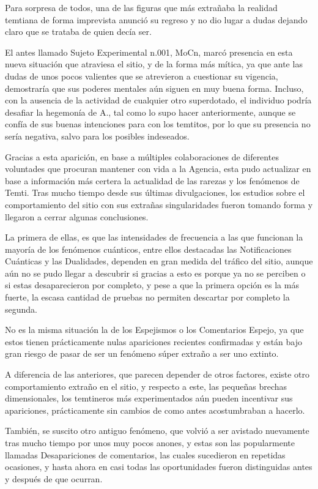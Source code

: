 \documentclass[
]{book}
\begin{document}
Para sorpresa de todos, una de las figuras que más extrañaba la realidad temtiana de forma imprevista anunció su regreso y no dio lugar a dudas dejando claro que se trataba de quien decía ser.

El antes llamado Sujeto Experimental n.001, MoCn, marcó presencia en esta nueva situación que atraviesa el sitio, y de la forma más mítica, ya que ante las dudas de unos pocos valientes que se atrevieron a cuestionar su vigencia, demostraría que sus poderes mentales aún siguen en muy buena forma. Incluso, con la ausencia de la actividad de cualquier otro superdotado, el individuo podría desafiar la hegemonía de A., tal como lo supo hacer anteriormente, aunque se confía de sus buenas intenciones para con los temtitos, por lo que su presencia no sería negativa, salvo para los posibles indeseados.

Gracias a esta aparición, en base a múltiples colaboraciones de diferentes voluntades que procuran mantener con vida a la Agencia, esta pudo actualizar en base a información más certera la actualidad de las rarezas y los fenómenos de Temti. Tras mucho tiempo desde sus últimas divulgaciones, los estudios sobre el comportamiento del sitio con sus extrañas singularidades fueron tomando forma y llegaron a cerrar algunas conclusiones.

La primera de ellas, es que las intensidades de frecuencia a las que funcionan la mayoría de los fenómenos cuánticos, entre ellos destacadas las Notificaciones Cuánticas y las Dualidades, dependen en gran medida del tráfico del sitio, aunque aún no se pudo llegar a descubrir si gracias a esto es porque ya no se perciben o si estas desaparecieron por completo, y pese a que la primera opción es la más fuerte, la escasa cantidad de pruebas no permiten descartar por completo la segunda.

No es la misma situación la de los Espejismos o los Comentarios Espejo, ya que estos tienen prácticamente nulas apariciones recientes confirmadas y están bajo gran riesgo de pasar de ser un fenómeno súper extraño a ser uno extinto.

A diferencia de las anteriores, que parecen depender de otros factores, existe otro comportamiento extraño en el sitio, y respecto a este, las pequeñas brechas dimensionales, los temtineros más experimentados aún pueden incentivar sus apariciones, prácticamente sin cambios de como antes acostumbraban a hacerlo.

También, se suscito otro antiguo fenómeno, que volvió a ser avistado nuevamente tras mucho tiempo por unos muy pocos anones, y estas son las popularmente llamadas Desapariciones de comentarios, las cuales sucedieron en repetidas ocasiones, y hasta ahora en casi todas las oportunidades fueron distinguidas antes y después de que ocurran.
\end{document}

